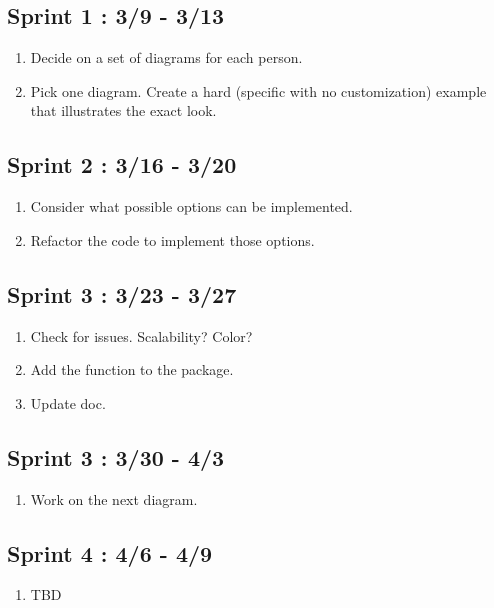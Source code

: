 \documentclass[10pt,a4paper,english]{article}
\begin{document}
\subsection{Sprint 1 : 3/9 - 3/13}
\begin{enumerate}
\item Decide on a set of diagrams for each person.
\item Pick one diagram. Create a hard (specific with no customization) example that illustrates the exact look.
\end{enumerate}
\subsection{Sprint 2 : 3/16 - 3/20}
\begin{enumerate}
\item Consider what possible options can be implemented.
\item Refactor the code to implement those options.
\end{enumerate}
\subsection{Sprint 3 : 3/23 - 3/27}
\begin{enumerate}
\item Check for issues. Scalability? Color? 
\item Add the function to the package.
\item Update doc.
\end{enumerate}
\subsection{Sprint 3 : 3/30 - 4/3}
\begin{enumerate}
\item Work on the next diagram.
\end{enumerate}
\subsection{Sprint 4 : 4/6 - 4/9}
\begin{enumerate}
\item TBD
\end{enumerate}
\end{document}

